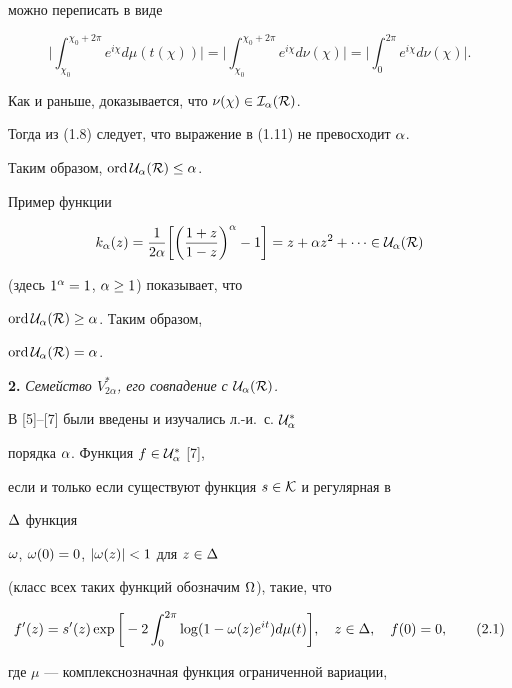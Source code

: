 \begin{pf}
можно переписать в виде


$$


\bigg|\int_{\chi_0}^{\chi_0+2\pi}e^{i\chi} d\mu(t(\chi))\bigg|


=\bigg|\int_{\chi_0}^{\chi_0+2\pi}e^{i\chi} d\nu(\chi)\bigg|


=\bigg|\int_{0}^{2\pi}e^{i\chi} d\nu(\chi)\bigg|.


$$


Как и раньше, доказывается, что $\nu(\chi)\in\cal I_\alpha(R)$.


Тогда из (1.8) следует, что выражение в (1.11) не превосходит $\alpha$.


Таким образом, $\operatorname{ord}\cal U_\alpha(R)\le\alpha$.





Пример функции


$$


k_\al(z)=\frac{1}{2\al}\bigg[\bigg(\frac{1+z}{1-z}\bigg)^\al-1\bigg]


=z+\al z^2+\dotsb \in\Ual(R)


$$


(здесь $1^\alpha=1$, $\alpha\ge 1$) показывает, что


$\operatorname{ord} \cal U_\alpha(R)\ge\alpha$. Таким образом,


$\operatorname{ord} \cal U_\alpha(R)=\alpha$.


\end{pf}





{\bf 2.} {\it Семейство $V_{2\alpha}^*$, его совпадение с $\cal U_\alpha(R)$.}


В [5]--[7] были введены и изучались л.-и.~с. $\cal U_\alpha^*$


порядка $\alpha$. Функция $f\in\cal U_\alpha^*$ [7],


если и только если существуют функция $s\in\cal K$ и регулярная в


$\Delta$ функция


$\omega$, $\omega(0)=0$, $|\omega(z)|<1$ для $z\in\Delta$


(класс всех таких функций обозначим $\Omega$), такие, что


\begin{equation}


f'(z)=s'(z)\exp\bigg[-2\int_0^{2\pi}\log(1-\om(z)\et)d\mu(t)\bigg],


\quad z\in\De,\quad f(0)=0, \tag{2.1}


\end{equation}


где $\mu$ --- комплекснозначная функция ограниченной вариации,


